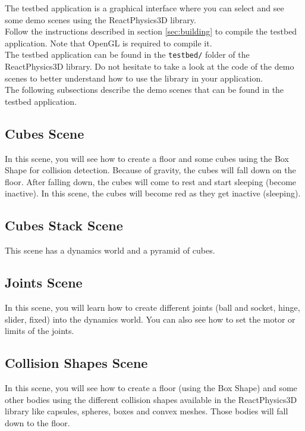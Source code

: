 \documentclass[a4paper,12pt]{article}
\begin{document}
    The testbed application is a graphical interface where you can select and see some demo scenes using the
    ReactPhysics3D library. \\

    Follow the instructions described in section \ref{sec:building} to
    compile the testbed application. Note that OpenGL is required to compile it. \\

    The testbed application can be found in the \texttt{testbed/} folder of
    the ReactPhysics3D library. Do not hesitate to take a look at the code of the demo scenes to better understand how
    to use the library in your application. \\

    The following subsections describe the demo scenes that can be found in the testbed application.

    \subsection{Cubes Scene}

    In this scene, you will see how to create a floor and some cubes using the Box Shape for collision detection. Because of gravity,
    the cubes will fall down on the floor. After falling down, the cubes will come to rest and start sleeping (become inactive). In this scene,
    the cubes will become red as they get inactive (sleeping).

   \subsection{Cubes Stack Scene}

    This scene has a dynamics world and a pyramid of cubes.

    \subsection{Joints Scene}

    In this scene, you will learn how to create different joints (ball and socket, hinge, slider, fixed) into the dynamics world. You can also see how
    to set the motor or limits of the joints.

    \subsection{Collision Shapes Scene}

    In this scene, you will see how to create a floor (using the Box Shape) and some other bodies using the different collision shapes available
    in the ReactPhysics3D library like capsules, spheres, boxes and convex meshes. Those bodies will fall down to the floor.
\end{document}

